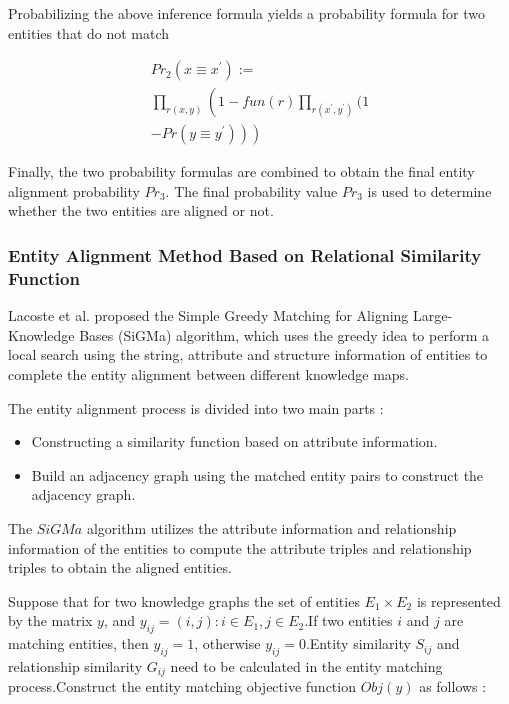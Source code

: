 \documentclass[sigconf]{acmart}
\begin{document}
{Probabilizing the above inference formula yields a probability formula for two entities that do not match

\begin{equation}
    \begin{array}{l} 
        \textit{Pr}_{2}\left(x \equiv x^{\prime}\right):= \\
        \prod_{r(x, y)}\left(1-\textit{fun}(r) \prod_{r\left(x^{\prime}, y^{\prime}\right)}(1\right. \\
        \left.\left.-\textit{Pr}\left(y \equiv y^{\prime}\right)\right)\right)
    \end{array}
\end{equation}

Finally, the two probability formulas are combined to obtain the final entity alignment probability $Pr_3$. The final probability value $Pr_3$ is used to determine whether the two entities are aligned or not.

\subsubsection{Entity Alignment Method Based on Relational Similarity Function}

Lacoste et al. \cite{lacoste2013sigma} proposed the Simple Greedy Matching for Aligning Large-Knowledge Bases (SiGMa) algorithm, which uses the greedy idea to perform a local search using the string, attribute and structure information of entities to complete the entity alignment between different knowledge maps.

The entity alignment process is divided into two main parts :
\begin{itemize}
    \item Constructing a similarity function based on attribute information.
    \item Build an adjacency graph using the matched entity pairs to construct the adjacency graph.
\end{itemize}

The $SiGMa$ algorithm utilizes the attribute information and relationship information of the entities to compute the attribute triples and relationship triples to obtain the aligned entities.

Suppose that for two knowledge graphs the set of entities $E_1 \times E_2$ is represented by the matrix $y$, and  $y_{i j}=(i, j): i \in E_{1}, j \in E_{2}$.If two entities $i$ and $j$ are matching entities, then $y_{ij}=1$, otherwise $y_{ij}=0$.Entity similarity $S_{ij}$ and relationship similarity $G_{ij}$ need to be calculated in the entity matching process.Construct the entity matching objective function $Obj(y)$ as follows :

}
\end{document}
